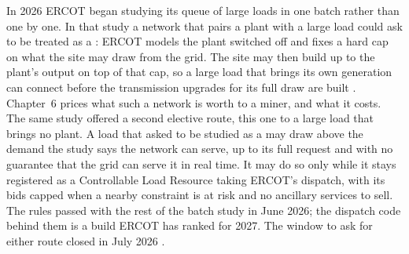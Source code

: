 In 2026 ERCOT began studying its queue of large loads in one batch rather than one by one. In that study a network that pairs a plant with a large load could ask to be treated as a : ERCOT models the plant switched off and fixes a hard cap on what the site may draw from the grid. The site may then build up to the plant's output on top of that cap, so a large load that brings its own generation can connect before the transmission upgrades for its full draw are built \autocite{ercot2026protocols,ercotplanningguide2026}. %
Chapter~6 prices what such a network is worth to a miner, and what it costs.
The same study offered a second elective route, this one to a large load that brings no plant. A load that asked to be studied as a  may draw above the demand the study says the network can serve, up to its full request and with no guarantee that the grid can serve it in real time. It may do so only while it stays registered as a Controllable Load Resource taking ERCOT's dispatch, with its bids capped when a nearby constraint is at risk and no ancillary services to sell. The rules passed with the rest of the batch study in June 2026; the dispatch code behind them is a build ERCOT has ranked for 2027. The window to ask for either route closed in July 2026 \autocite{ercotplanningguide2026,ercot2026protocols}. %
